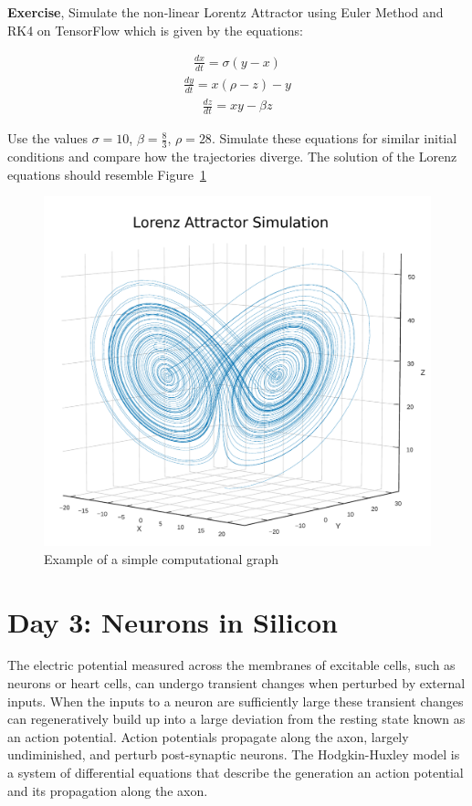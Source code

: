 \documentclass[10pt,letterpaper]{article}
\begin{document}
\textbf{Exercise}, Simulate the non-linear Lorentz Attractor using Euler Method and RK4 on TensorFlow which is given by the equations:

\begin{eqnarray}\frac{dx}{dt}=\sigma(y-x) \end{eqnarray}
\begin{eqnarray}\frac{dy}{dt}=x(\rho-z)-y \end{eqnarray}
\begin{eqnarray}\frac{dz}{dt}=xy-\beta z \end{eqnarray}

Use the values $\sigma =10$, $\beta =\frac{8}{3}$, $\rho =28$. Simulate these equations for similar initial conditions and compare how the trajectories diverge. The solution of the Lorenz equations should resemble Figure~\ref{fig:Lorenz}
 
\begin{figure}[H]
\begin{center}
\includegraphics[scale=0.5]{Figures/fig6_op.pdf} 
\caption{Example of a simple computational graph}
\label{fig:Lorenz}
\end{center}

\end{figure}

\section*{Day 3: Neurons in Silicon}
The electric potential measured across the membranes of excitable cells, such as neurons or heart cells, can undergo transient changes when perturbed by external inputs. When the inputs to a neuron are sufficiently large these transient changes can regeneratively build up into a large deviation from the resting state known as an action potential. Action potentials propagate along the axon, largely undiminished, and perturb post-synaptic neurons. The Hodgkin-Huxley model is a system of differential equations that describe the generation an action potential and its propagation along the axon.
\end{document}
